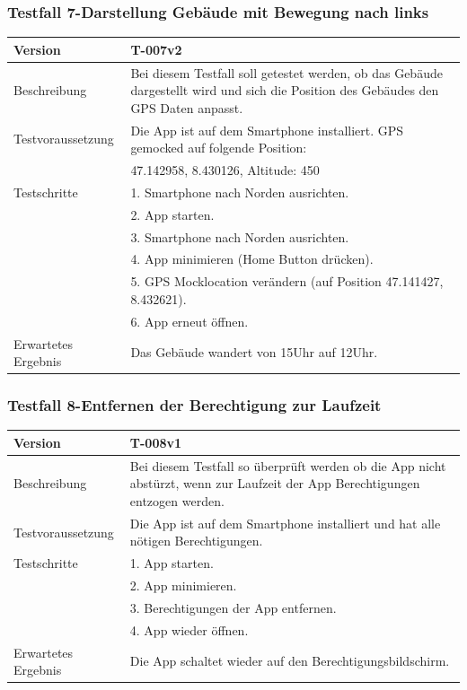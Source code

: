 \documentclass[a4paper]{scrreprt}
\begin{document}
\subsubsection{Testfall 7-Darstellung Gebäude mit Bewegung nach links}
\begin{tabularx}{\textwidth}{|l|X|}
\hline 
	Version &
	T-007v2 \\ 
\hline 
	Beschreibung & 
	Bei diesem Testfall soll getestet werden, ob das Gebäude dargestellt wird und sich die Position des Gebäudes den GPS Daten anpasst. \\ 
\hline 
	Testvoraussetzung &
	Die App ist auf dem Smartphone installiert. GPS gemocked auf folgende Position: \\ &
		47.142958, 8.430126, Altitude: 450 \\ 
\hline 
	Testschritte & 
		1. Smartphone nach Norden ausrichten. \\ &
		2. App starten. \\ &
		3. Smartphone nach Norden ausrichten. \\ &
		4. App minimieren (Home Button drücken). \\ &
		5. GPS Mocklocation verändern (auf Position  47.141427, 8.432621). \\ &
		6. App erneut öffnen. \\
\hline
	Erwartetes Ergebnis &
	Das Gebäude wandert von 15Uhr auf 12Uhr. \\ 
\hline 
\end{tabularx}
\subsubsection{Testfall 8-Entfernen der Berechtigung zur Laufzeit}
\begin{tabularx}{\textwidth}{|l|X|}
\hline 
	Version &
	T-008v1 \\ 
\hline 
	Beschreibung & 
	Bei diesem Testfall so überprüft werden ob die App nicht abstürzt, wenn zur Laufzeit der App Berechtigungen entzogen werden. \\ 
\hline 
	Testvoraussetzung &
	Die App ist auf dem Smartphone installiert und hat alle nötigen Berechtigungen. \\ 
\hline 
	Testschritte & 
		1. App starten. \\ &
		2. App minimieren. \\ &
		3. Berechtigungen der App entfernen. \\ &
		4. App wieder öffnen. \\
\hline
	Erwartetes Ergebnis &
	Die App schaltet wieder auf den Berechtigungsbildschirm. \\ 
\hline 
\end{tabularx}
\end{document}
